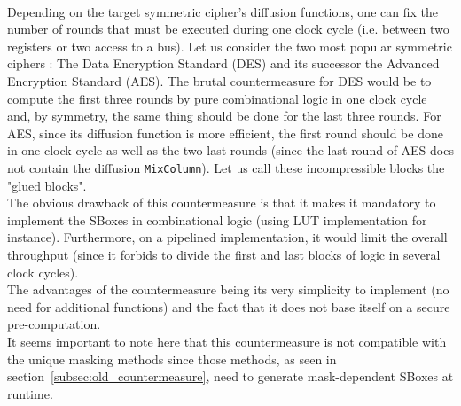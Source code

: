 \documentclass[11pt,a4paper]{article}
\begin{document}
{{{{{{\paragraph{}
Depending on the target symmetric cipher's diffusion functions, one can fix the number of rounds that must be executed during one clock cycle (i.e. between 
two registers or two access to a bus). Let us consider the two most popular symmetric ciphers : The Data Encryption Standard (DES) and its successor the Advanced Encryption Standard (AES).
The brutal countermeasure for DES would be to compute the first three rounds by pure combinational logic in one clock cycle and, by symmetry, the same thing should be done for the 
last three rounds. For AES, since its diffusion function is more efficient, the first round should be done in one clock cycle as well as the two last rounds (since the last round of AES does not 
contain the diffusion \texttt{MixColumn}). Let us call these incompressible blocks the "glued blocks".\\
The obvious drawback of this countermeasure is that it makes it mandatory to implement the SBoxes in combinational logic (using LUT implementation for instance). Furthermore, on a
pipelined implementation, it would limit the overall throughput (since it forbids to divide the first and last blocks of logic in several clock cycles). \\
The advantages of the countermeasure being its very simplicity to implement (no need for additional functions) and the fact that it does not base itself on a secure pre-computation.\\
It seems important to note here that this countermeasure is not compatible with the unique masking methods since those methods, as seen in section~\ref{subsec:old_countermeasure}, need to 
generate mask-dependent SBoxes at runtime.
\vspace{1ex} \\
}}}}}}
\end{document}
